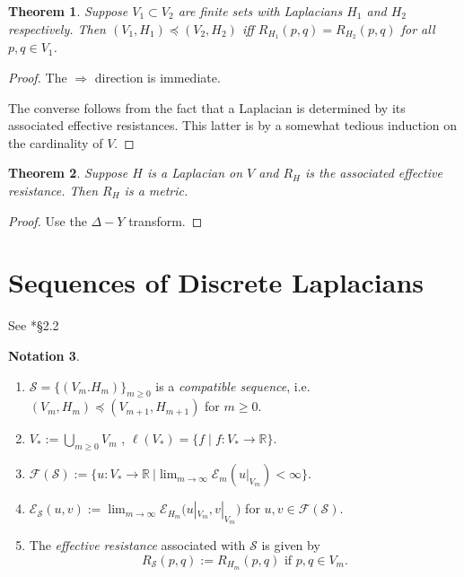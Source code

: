 \documentclass[a4paper]{amsart}
\theoremstyle{plain}
\newtheorem{theorem}{Theorem}[section]
\theoremstyle{definition}
\newtheorem{notation}[theorem]{Notation}%
\theoremstyle{remark}
\begin{document}
\begin{theorem} Suppose $ V_1 \subset V_2 $ are finite sets with Laplacians $ H_1 $ and $ H_2 $ respectively.  Then $ (V_1,H_1) \preccurlyeq (V_2,H_2 ) $ iff $ R_{H_1}(p,q) = R_{H_2}(p,q) $ for all $ p,q \in V_1 $.
\end{theorem} 

\begin{proof} The $ \Longrightarrow  $ direction is immediate.  

The converse follows from the fact that a Laplacian is determined by its associated effective resistances.  This latter is by a somewhat tedious induction on the cardinality of $ V $.
\end{proof} 


\begin{theorem} \label{rfim} Suppose $ H  $ is a Laplacian on $ V $ and $ R_H $ is the associated effective resistance. Then $ R_H $ is a metric.
\end{theorem} 

\begin{proof} Use the $ \Delta - Y $ transform. \end{proof} 




\section{\textbf{Sequences of Discrete Laplacians}}

See \cite{Kig}*{\S 2.2}

\begin{notation} \label{ntcs}\mbox{}
\begin{enumerate}
 \item $ \mathcal{S} = \{ (V_m. H_m)\} _{m\geq 0} $ is a \emph{compatible sequence}, i.e.\ $ (V_m, H_m) \preccurlyeq  (V_{m+1}, H_{m+1}) $ for $ m\geq 0 $.
\item $ V_* := \bigcup_{m\geq 0 } V_m $ , $ \ell(V_*) = \{ f \mid f : V_* \to \mathbb{R} \} $.
\item $ \mathcal{F}( \mathcal{S} ) := \big\{ u : V_* \to \mathbb{R}\  \big| \lim_{m\to\infty } \mathcal{E} _m(u|_{V_m} ) < \infty \big\}$.
\item $ \mathcal{E} _{ \mathcal{S} }(u,v) := \lim_{m \to \infty } \mathcal{E} _{H_m} \big( u|_{V_m}, v|_{V_m}\big)    $ for $ u,v \in  \mathcal{F}( \mathcal{S} ) $.
\item The \emph{effective resistance} associated with $ \mathcal{S} $ is given by 
\[
 R_{ \mathcal{S} } (p,q) := R_{ H_m } (p,q) \text{ if } p,q \in V_m .
 \]
\end{enumerate} 
\end{notation}
\end{document}
